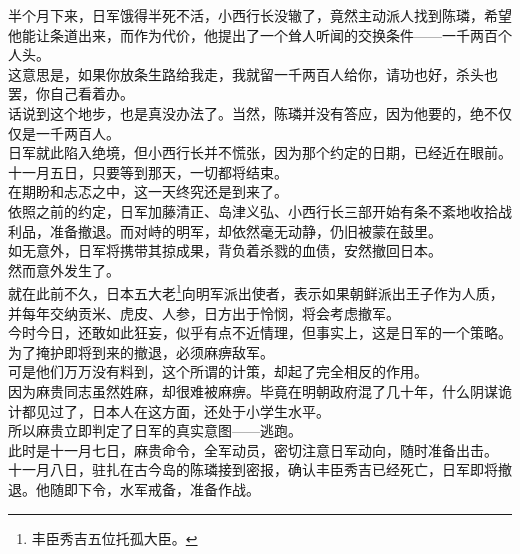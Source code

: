 \begin{multicols}{\theparacolNo}
半个月下来，日军饿得半死不活，小西行长没辙了，竟然主动派人找到陈璘，希望他能让条道出来，而作为代价，他提出了一个耸人听闻的交换条件——一千两百个人头。\\

这意思是，如果你放条生路给我走，我就留一千两百人给你，请功也好，杀头也罢，你自己看着办。\\

话说到这个地步，也是真没办法了。当然，陈璘并没有答应，因为他要的，绝不仅仅是一千两百人。\\

日军就此陷入绝境，但小西行长并不慌张，因为那个约定的日期，已经近在眼前。\\

十一月五日，只要等到那天，一切都将结束。\\

在期盼和忐忑之中，这一天终究还是到来了。\\

依照之前的约定，日军加藤清正、岛津义弘、小西行长三部开始有条不紊地收拾战利品，准备撤退。而对峙的明军，却依然毫无动静，仍旧被蒙在鼓里。\\

如无意外，日军将携带其掠成果，背负着杀戮的血债，安然撤回日本。\\

然而意外发生了。\\

就在此前不久，日本五大老\footnote{丰臣秀吉五位托孤大臣。}向明军派出使者，表示如果朝鲜派出王子作为人质，并每年交纳贡米、虎皮、人参，日方出于怜悯，将会考虑撤军。\\

今时今日，还敢如此狂妄，似乎有点不近情理，但事实上，这是日军的一个策略。为了掩护即将到来的撤退，必须麻痹敌军。\\

可是他们万万没有料到，这个所谓的计策，却起了完全相反的作用。\\

因为麻贵同志虽然姓麻，却很难被麻痹。毕竟在明朝政府混了几十年，什么阴谋诡计都见过了，日本人在这方面，还处于小学生水平。\\

所以麻贵立即判定了日军的真实意图——逃跑。\\

此时是十一月七日，麻贵命令，全军动员，密切注意日军动向，随时准备出击。\\

十一月八日，驻扎在古今岛的陈璘接到密报，确认丰臣秀吉已经死亡，日军即将撤退。他随即下令，水军戒备，准备作战。\\


\end{multicols}
